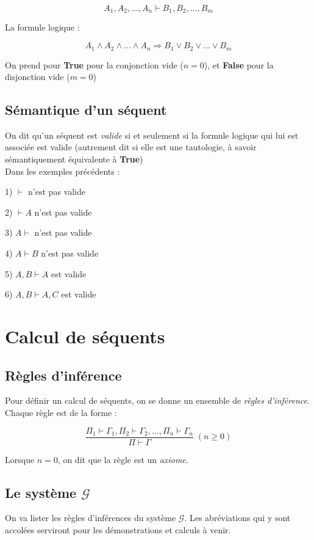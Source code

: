 \documentclass{article}
\begin{document}
$$A_1,A_2,...,A_n \vdash B_1,B_2,...,B_m$$

La formule logique :

$$A_1 \wedge A_2 \wedge ... \wedge A_n \Rightarrow B_1 \lor B_2 \lor ... \lor B_m$$

On prend pour \textbf{True} pour la conjonction vide ($n=0$), et \textbf{False} pour la disjonction vide ($m=0$)

\subsection{Sémantique d'un séquent}

On dit qu'un séquent est \textit{valide} si et seulement si la formule logique qui lui est associée est valide (autrement dit si elle est une tautologie, à savoir sémantiquement équivalente à \textbf{True})
\\

Dans les exemples précédents :

1) $\vdash$ n'est pas valide

2) $\vdash A$ n'est pas valide

3) $A \vdash$ n'est pas valide

4) $A \vdash B$ n'est pas valide

5) $A,B \vdash A$ est valide

6) $A,B \vdash A,C$ est valide

\section{Calcul de séquents}

\subsection{Règles d'inférence}

Pour définir un calcul de séquents, on se donne un ensemble de \textit{règles d'inférence}. Chaque règle est de la forme :

$$\frac{\Pi_1 \vdash \Gamma_1 , \Pi_2 \vdash \Gamma_2 ,..., \Pi_n \vdash \Gamma_n}{\Pi \vdash \Gamma} \; (n \geq 0)$$

Lorsque $n=0$, on dit que la règle est un \textit{axiome}.

\subsection{Le système $\mathcal{G}$}
On va lister les règles d'inférences du système $\mathcal{G}$. Les abréviations qui y sont accolées serviront pour les démonstrations et calculs à venir.
\end{document}
